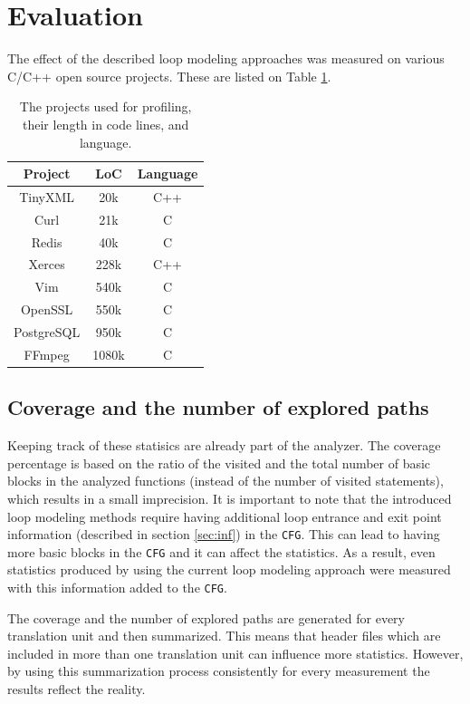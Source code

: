 \documentclass[oneside, a4paper, 12pt]{article}
\theoremstyle{definition}
\begin{document}
\section{Evaluation}

The effect of the described loop modeling approaches was measured on various 
C/C++ open source projects. These are listed on Table \ref{tab:lines}.

\begin{table}[!htb]
	\centering
\begin{tabular}{ |c||c|c| }
	\hline
	Project & LoC & Language \\
	\hline
	TinyXML & 20k & C++ \\
	\hline
	Curl & 21k & C  \\ 
	\hline
	Redis & 40k & C \\ 
	\hline
	Xerces & 228k & C++ \\ 
	\hline
	Vim & 540k & C \\ 
	\hline
	OpenSSL & 550k & C  \\ 
	\hline
	PostgreSQL & 950k & C \\ 
	\hline
	FFmpeg & 1080k & C \\	
	\hline
\end{tabular}
\caption{The projects used for profiling, their length in code lines, and 
language.}\label{tab:lines}
\end{table}

\subsection{Coverage and the number of explored paths}
Keeping track of these statisics are already part of the analyzer. The 
coverage percentage is based on the ratio of the visited and the total number 
of basic blocks in the analyzed functions (instead of the number of visited statements),
which results in a small imprecision. 
It is important to note that the introduced loop modeling methods require having 
additional loop entrance and exit point information (described in section 
\ref{sec:inf}) in the \texttt{CFG}. This can lead to having more 
basic blocks in the \texttt{CFG} and it can affect the statistics. As a result, 
even statistics produced by using the current loop modeling 
approach were measured with this information added to the \texttt{CFG}.

The coverage and the number of explored paths are generated for every 
translation unit and then summarized. This means that header files which 
are included in more than one translation unit can influence more statistics.
However, by using this summarization process consistently for every measurement 
the results reflect the reality. 
\end{document}
